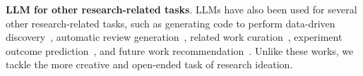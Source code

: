\textbf{LLM for other research-related tasks}. 
LLMs have also been used for several other research-related tasks, such as generating code to perform data-driven discovery~\cite{Majumder2024DiscoveryBenchTD,Hu2024InfiAgentDABenchEA,Guo2024DSAgentAD,Gu2024BLADEBL,Ifargan2024AutonomousLR}, automatic review generation~\cite{DArcy2024MARGMR,Liang2023CanLL}, related work curation~\cite{Kang2024ResearchArenaBL,Ajith2024LitSearchAR,Press2024CiteMECL,Lehr2024ChatGPTAR}, experiment outcome prediction~\cite{Lehr2024ChatGPTAR,Zhang2024MASSWAN,Manning2024AutomatedSS,predictSocialScience}, and future work recommendation~\cite{Zhang2024MASSWAN}. 
Unlike these works, we tackle the more creative and open-ended task of research ideation. 


